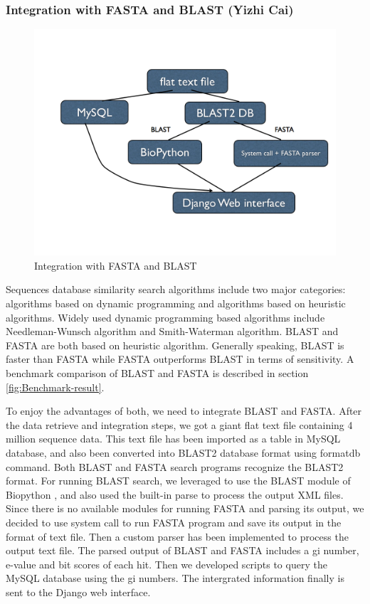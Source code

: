 \documentclass[11pt,letterpaper,twoside,english]{article}
\begin{document}
\subsubsection{\label{sub:Integration-with-FASTA}Integration with FASTA and
BLAST (Yizhi Cai)}

%
\begin{figure}[H]
\begin{centering}
\includegraphics[width=0.7\linewidth]{figures/Data_flow}
\par\end{centering}

\caption{\label{fig:Integration-with-FASTA}Integration with FASTA and BLAST}

\end{figure}


Sequences database similarity search algorithms include two major
categories: algorithms based on dynamic programming and algorithms
based on heuristic algorithms. Widely used dynamic programming based
algorithms include Needleman-Wunsch algorithm and Smith-Waterman algorithm.
BLAST and FASTA are both based on heuristic algorithm. Generally speaking,
BLAST is faster than FASTA while FASTA outperforms BLAST in terms
of sensitivity. A benchmark comparison of BLAST and FASTA is described
in section \ref{fig:Benchmark-result}.

To enjoy the advantages of both, we need to integrate BLAST and FASTA.
After the data retrieve and integration steps, we got a giant flat
text file containing 4 million sequence data. This text file has been
imported as a table in MySQL database, and also been converted into
BLAST2 database format using formatdb command. Both BLAST and FASTA
search programs recognize the BLAST2 format. For running BLAST search,
we leveraged to use the BLAST module of Biopython
\citet{cock_biopython:_2009},
and also used the built-in parse to process the output XML files.
Since there is no available modules for running FASTA and parsing
its output, we decided to use system call to run FASTA program and
save its output in the format of text file. Then a custom parser has
been implemented to process the output text file. The parsed output
of BLAST and FASTA includes a gi number, e-value and bit scores of
each hit. Then we developed scripts to query the MySQL database using
the gi numbers. The intergrated information finally is sent to the
Django web interface.
\end{document}
